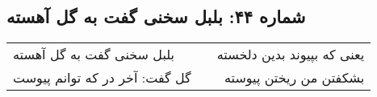 \begin{center}
\section*{شماره ۴۴: بلبل سخنی گفت به گل آهسته}
\label{sec:044}
\begin{longtable}{l p{0.5cm} r}
بلبل سخنی گفت به گل آهسته
&&
یعنی که بپیوند بدین دلخسته
\\
گل گفت: آخر در که توانم پیوست
&&
بشکفتن من ریختن پیوسته
\\
\end{longtable}
\end{center}
